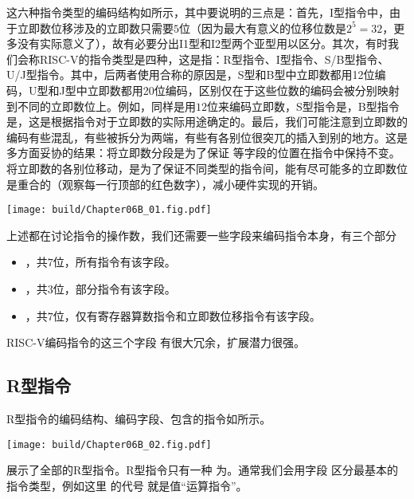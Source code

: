 这六种指令类型的编码结构如所示，其中要说明的三点是：首先，I型指令中，由于立即数位移涉及的立即数只需要$5$位（因为最大有意义的位移位数是$2^5=32$，更多没有实际意义了），故有必要分出I1型和I2型两个亚型用以区分。其次，有时我们会称RISC-V的指令类型是四种，这是指：R型指令、I型指令、S/B型指令、U/J型指令。其中，后两者使用合称的原因是，S型和B型中立即数都用12位编码，U型和J型中立即数都用20位编码，区别仅在于这些位数的编码会被分别映射到不同的立即数位上。例如，同样是用$12$位来编码立即数，S型指令是，B型指令是，这是根据指令对于立即数的实际用途确定的。最后，我们可能注意到立即数的编码有些混乱，有些被拆分为两端，有些有各别位很突兀的插入到别的地方。这是多方面妥协的结果：将立即数分段是为了保证 等字段的位置在指令中保持不变。将立即数的各别位移动，是为了保证不同类型的指令间，能有尽可能多的立即数位是重合的（观察每一行顶部的红色数字），减小硬件实现的开销。

\begin{Figure}
    \texttt{[image: build/Chapter06B\_01.fig.pdf]}
\end{Figure}

上述都在讨论指令的操作数，我们还需要一些字段来编码指令本身，有三个部分
\begin{itemize}
    \item {}，共$7$位，所有指令有该字段。
    \item {}，共$3$位，部分指令有该字段。
    \item {}，共$7$位，仅有寄存器算数指令和立即数位移指令有该字段。
\end{itemize}

RISC-V编码指令的这三个字段 有很大冗余，扩展潜力很强。

\subsection{R型指令}

R型指令的编码结构、编码字段、包含的指令如所示。
\begin{Figure}[R型指令的编码]
    \texttt{[image: build/Chapter06B\_02.fig.pdf]}
\end{Figure}

展示了全部的R型指令。R型指令只有一种 为。通常我们会用字段 区分最基本的指令类型，例如这里 的代号 就是值“运算指令”。

